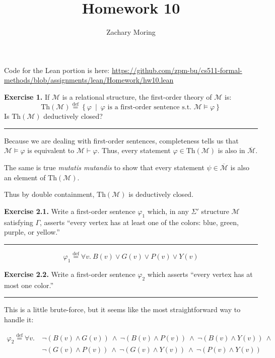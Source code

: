 \documentclass{article}
\title{Homework 10}
\author{Zachary Moring}
\newcommand{\Break}{\vspace{0.2cm}\hrule{}\vspace{0.2cm}}
\newcommand{\defas}{\overset{\text{def}}{=}}
\newcommand{\scrM}{\mathcal{M}}
\begin{document}
 \maketitle

Code for the Lean portion is here:
\url{https://github.com/zpm-bu/cs511-formal-methods/blob/assignments/lean/Homework/hw10.lean}

\vspace{2cm}

\noindent\textbf{Exercise 1.} If $\scrM$ is a relational structure, the
first-order theory of $\scrM$ is:
\[
  \text{Th}(\scrM) \defas \left\{ \varphi ~\middle|~
  \varphi \text{ is a first-order sentence s.t. } \scrM \vDash \varphi
  \right\}
\]
Is $\text{Th}(\scrM)$ deductively closed?

\Break{}


Because we are dealing with first-order sentences, completeness tells us that
$\scrM \vDash \varphi$ is equivalent to $\scrM \vdash \varphi$.
Thus, every statement $\varphi \in \text{Th}(\scrM)$ is also in
$\overline{\scrM}$.

The same is true \textit{mutatis mutandis} to show that every statement $\psi
\in \overline{\scrM}$ is also an element of $\text{Th}(\scrM)$.

Thus by double containment, $\text{Th}(\scrM)$ is deductively closed.

\newpage{}

\noindent\textbf{Exercise 2.1.} Write a first-order sentence $\varphi_1$ which,
in any $\Sigma\prime$ structure $\scrM$ satisfying $\Gamma$, asserts
``every vertex has at least one of the colors: blue, green, purple, or
yellow.''

\Break{}

\[
  \varphi_1 \defas \forall v.~B(v) \vee G(v) \vee P(v) \vee Y(v)
\]

\vspace{2cm}

\noindent\textbf{Exercise 2.2.} Write a first-order sentence $\varphi_2$ which
asserts ``every vertex has at most one color.''

\Break{}

This is a little brute-force, but it seems like the most straightforward way
to handle it:

\begin{align*}
  \varphi_2 \defas \forall v.~ &\lnot(B(v) \wedge G(v))~\wedge~ \lnot(B(v)
  \wedge P(v)) ~\wedge~ \lnot(B(v) \wedge Y(v)) ~\wedge~ \\
  & \lnot(G(v) \wedge P(v)) ~\wedge~ \lnot(G(v) \wedge Y(v)) ~\wedge~
  \lnot(P(v) \wedge Y(v))
\end{align*}
\end{document}
